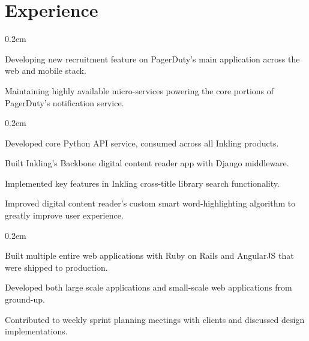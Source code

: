 \documentclass[]{deedy-resume}
\begin{document}
\hfill
\begin{minipage}[t]{0.66\textwidth}


\section{Experience}

\vspace{\topsep}
\begin{tightemize}\itemsep0.2em
\item Developing new recruitment feature on PagerDuty's main application across the web and mobile stack.
\item Maintaining highly available micro-services powering the core portions of PagerDuty's notification service.
\end{tightemize}

\vspace{\topsep}
\begin{tightemize}\itemsep0.2em
\item Developed core Python API service, consumed across all Inkling products.
\item Built Inkling's Backbone digital content reader app with Django middleware.
\item Implemented key features in Inkling cross-title library search functionality.
\item Improved digital content reader's custom smart word-highlighting algorithm to greatly improve user experience.
\end{tightemize}


\begin{tightemize}\itemsep0.2em
\item Built multiple entire web applications with Ruby on Rails and AngularJS that were shipped to production.
\item Developed both large scale applications and small-scale web applications from ground-up.
\item Contributed to weekly sprint planning meetings with clients and discussed design implementations.
\end{tightemize}


\end{minipage}
\end{document}
